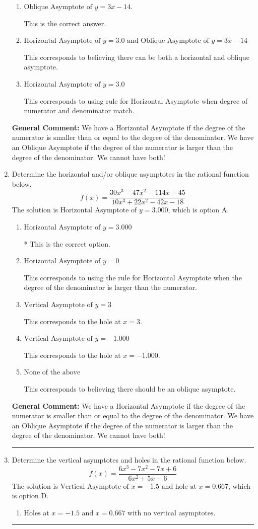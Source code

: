 \documentclass{extbook}[14pt]
\newcommand{\litem}[1]{\item #1

\rule{\textwidth}{0.4pt}}
\begin{document}
\begin{enumerate}
{\begin{enumerate}[label=\Alph*.]
This corresponds to considering where the denominator is equal to 0 as horizontal asymptote.
\item \( \text{Oblique Asymptote of } y = 3x -14. \)

This is the correct answer.
\item \( \text{Horizontal Asymptote of } y = 3.0 \text{ and Oblique Asymptote of } y = 3x -14 \)

This corresponds to believing there can be both a horizontal and oblique asymptote.
\item \( \text{Horizontal Asymptote of } y = 3.0  \)

This corresponds to using rule for Horizontal Asymptote when degree of numerator and denominator match.
\end{enumerate}

\textbf{General Comment:} We have a Horizontal Asymptote if the degree of the numerator is smaller than or equal to the degree of the denominator. We have an Oblique Asymptote if the degree of the numerator is larger than the degree of the denominator. We cannot have both!
}
\litem{
Determine the horizontal and/or oblique asymptotes in the rational function below.
\[ f(x) = \frac{30x^{3} -47 x^{2} -114 x -45}{10x^{3} +22 x^{2} -42 x -18} \]The solution is \( \text{Horizontal Asymptote of } y = 3.000  \), which is option A.\begin{enumerate}[label=\Alph*.]
\item \( \text{Horizontal Asymptote of } y = 3.000  \)

* This is the correct option.
\item \( \text{Horizontal Asymptote of } y = 0  \)

This corresponds to using the rule for Horizontal Asymptote when the degree of the denominator is larger than the numerator.
\item \( \text{Vertical Asymptote of } y = 3  \)

This corresponds to the hole at $x = 3$.
\item \( \text{Vertical Asymptote of } y = -1.000  \)

This corresponds to the hole at $x = -1.000$.
\item \( \text{None of the above} \)

This corresponds to believing there should be an oblique asymptote.
\end{enumerate}

\textbf{General Comment:} We have a Horizontal Asymptote if the degree of the numerator is smaller than or equal to the degree of the denominator. We have an Oblique Asymptote if the degree of the numerator is larger than the degree of the denominator. We cannot have both!
}
\litem{
Determine the vertical asymptotes and holes in the rational function below.
\[ f(x) = \frac{6x^{3} -7 x^{2} -7 x + 6}{6x^{2} +5 x -6} \]The solution is \( \text{Vertical Asymptote of } x = -1.5 \text{ and hole at } x = 0.667 \), which is option D.\begin{enumerate}[label=\Alph*.]
\item \( \text{Holes at } x = -1.5 \text{ and } x = 0.667 \text{ with no vertical asymptotes.} \)


\end{enumerate}}
\end{enumerate}
\end{document}
